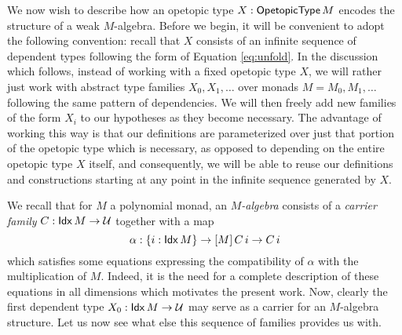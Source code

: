 We now wish to describe how an opetopic type $X : \mathsf{OpetopicType}\, M$ encodes
the structure of a weak $M$-algebra.  Before we begin, it will be
convenient to adopt the following convention: recall that $X$ consists
of an infinite sequence of dependent types following the form of
Equation \ref{eq:unfold}.  In the discussion which follows, instead of
working with a fixed opetopic type $X$, we will rather just work with
abstract type families $X_0 , X_1 , \dots$ over monads
$M = M_0, M_1, \dots$ following the same pattern of dependencies. We
will then freely add new families of the form $X_i$ to our hypotheses
as they become necessary.  The advantage of working this way is that
our definitions are parameterized over just that portion of the
opetopic type which is necessary, as opposed to depending on the
entire opetopic type $X$ itself, and consequently, we will be able to
reuse our definitions and constructions starting at any point in the
infinite sequence generated by $X$.

We recall that for $M$ a polynomial monad, an \emph{$M$-algebra}
consists of a \emph{carrier family} $C : \mathsf{Idx}\, M \to \mathcal{U}$ together with
a map
\[ \alpha : \{i : \mathsf{Idx}\, M\} \to [ M ]\, C\, i \to C\, i \] which
satisfies some equations expressing the compatibility of $\alpha$ with
the multiplication of $M$.  Indeed, it is the need for a complete
description of these equations in all dimensions which motivates the
present work.  Now, clearly the first dependent type
$X_0 : \mathsf{Idx}\, M \to \mathcal{U}$ may serve as a carrier for an $M$-algebra
structure.  Let us now see what else this sequence of families
provides us with.

